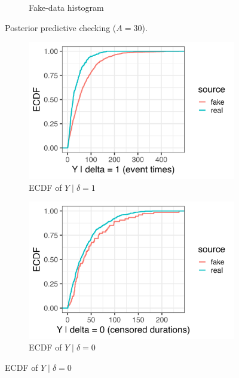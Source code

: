 \begin{figure}[htbp]
\begin{subfigure}[t]{0.35\textwidth}
  \caption{Fake-data histogram}
  \label{fig:fake-hist_a30}
\end{subfigure}
\caption{Posterior predictive checking ($A=30$).}
\label{fig:ppc-A30}
\end{figure}
\begin{figure}[htbp]
\centering
\begin{subfigure}[t]{0.3\textwidth}
  \centering
  \includegraphics[width=\linewidth]{images/ppc_event_ecdf_A1000.png}  %
  \caption{ECDF of $Y \mid \delta=1$}
  \label{fig:ecdf-event_a1000}
\end{subfigure}\hfill
\begin{subfigure}[t]{0.3\textwidth}
  \centering
  \includegraphics[width=\linewidth]{images/ppc_censored_ecdf_A1000.png} 
  \caption{ECDF of $Y \mid \delta=0$}
  \label{fig:ecdf-cens_a1000}
\end{subfigure}\hfill

\end{figure}
